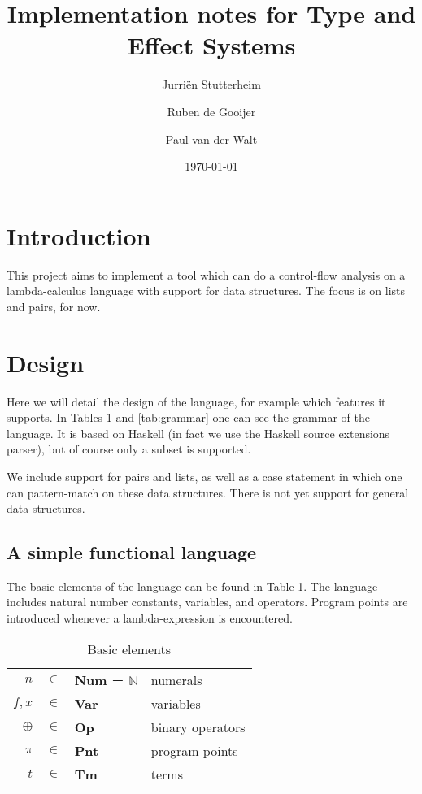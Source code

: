 \documentclass[a4paper]{article}
\author{Jurri\"en Stutterheim\and Ruben de Gooijer \and Paul van der Walt}
\date{\today}
\title{Implementation notes for Type and Effect Systems}
\begin{document}
\maketitle \tableofcontents

\section{Introduction}

This project aims to implement a tool which can do a control-flow analysis on a lambda-calculus language with support for
data structures. The focus is on lists and pairs, for now.

\section{Design}

Here we will detail the design of the language, for example which features it
supports. In Tables \ref{tab:elems} and \ref{tab:grammar} one can see the
grammar of the language. It is based on Haskell (in fact we use the Haskell
source extensions parser), but of course only a subset is supported. 

We include support for pairs and lists, as well as a case statement in which one
can pattern-match on these data structures. There is not yet support for general
data structures.

\subsection{A simple functional language}


The basic elements of the language can be found in Table \ref{tab:elems}. The
language includes natural number constants, variables, and operators. Program
points are introduced whenever a lambda-expression is encountered.
\begin{table}
    \centering
    \begin{tabular}{rcll}
        $n$ &           $\in$ & \textbf{Num = $\mathds{N}$}& numerals \\
        $f,x$ &         $\in$ & \textbf{Var}               & variables \\
        $\oplus$ &      $\in$ & \textbf{Op}                & binary operators \\
        $\pi$ &         $\in$ & \textbf{Pnt}               & program points  \\
        $t$ &           $\in$ & \textbf{Tm}                & terms \\
    \end{tabular}
    \caption{Basic elements}
    \label{tab:elems}
\end{table}
\end{document}

